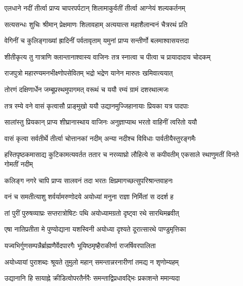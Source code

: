 \twolineshloka
{एलधाने नदीं तीर्त्वा प्राप्य चापरपर्पटान्}
{शिलामाकुर्वतीं तीर्त्वा आग्नेयं शल्यकर्तनम्} %

\twolineshloka
{सत्यसन्धः शुचिः श्रीमान् प्रेक्षमाणः शिलावहाम्}
{अत्ययात्स महाशैलान्वनं चैत्ररथं प्रति} %

\twolineshloka
{वेगिनीं च कुलिङ्गाख्यां ह्रादिनीं पर्वतावृताम्}
{यमुनां प्राप्य सन्तीर्णो बलमाश्वासयत्तदा} %

\twolineshloka
{शीतीकृत्य तु गात्राणि क्लान्तानाश्वास्य वाजिनः}
{तत्र स्नात्वा च पीत्वा च प्रायादादाय चोदकम्} %

\twolineshloka
{राजपुत्रो महारण्यमनभीक्ष्णोपसेवितम्}
{भद्रो भद्रेण यानेन मारुतः खमिवात्ययात्} %

\twolineshloka
{तोरणं दक्षिणार्धेन जम्बूप्रस्थमुपागमत्}
{वरूथं च ययौ रम्यं ग्रामं दशरथात्मजः} %

\twolineshloka
{तत्र रम्ये वने वासं कृत्वासौ प्राङ्मुखो ययौ}
{उद्यानमुज्जिहानायाः प्रियका यत्र पादपाः} %

\twolineshloka
{सालांस्तु प्रियकान् प्राप्य शीघ्रानास्थाय वाजिनः}
{अनुज्ञाप्याथ भरतो वाहिनीं त्वरितो ययौ} %

\twolineshloka
{वासं कृत्वा सर्वतीर्थे तीर्त्वा चोत्तानकां नदीम्}
{अन्या नदीश्च विविधाः पार्वतीयैस्तुरङ्गमैः} %

\threelineshloka
{हस्तिपृष्ठकमासाद्य कुटिकामत्यवर्तत}
{ततार च नरव्याघ्रो लौहित्ये स कपीवतीम्}
{एकसाले स्थाणुमतीं विनते गोमतीं नदीम्} %

\twolineshloka
{कलिङ्ग नगरे चापि प्राप्य सालवनं तदा}
{भरतः क्षिप्रमागच्छत्सुपरिश्रान्तवाहनः} %

\twolineshloka
{वनं च समतीत्याशु शर्वर्यामरुणोदये}
{अयोध्यां मनुना राज्ञा निर्मितां स ददर्श ह} %

\twolineshloka
{तां पुरीं पुरुषव्याघ्रः सप्तरात्रोषिटः पथि}
{अयोध्यामग्रतो दृष्ट्वा रथे सारथिमब्रवीत्} %

\twolineshloka
{एषा नातिप्रतीता मे पुण्योद्याना यशस्विनी}
{अयोध्या दृश्यते दूरात्सारथे पाण्डुमृत्तिका} %

\twolineshloka
{यज्वभिर्गुणसम्पन्नैर्ब्राह्मणैर्वेदपारगैः}
{भूयिष्ठमृष्हैराकीर्णा राजर्षिवरपालिता} %

\twolineshloka
{अयोध्यायां पुराशब्दः श्रूयते तुमुलो महान्}
{समन्तान्नरनारीणां तमद्य न शृणोम्यहम्} %

\twolineshloka
{उद्यानानि हि सायाह्ने क्रीडित्वोपरतैर्नरैः}
{समन्ताद्विप्रधावद्भिः प्रकाशन्ते ममान्यदा} %

